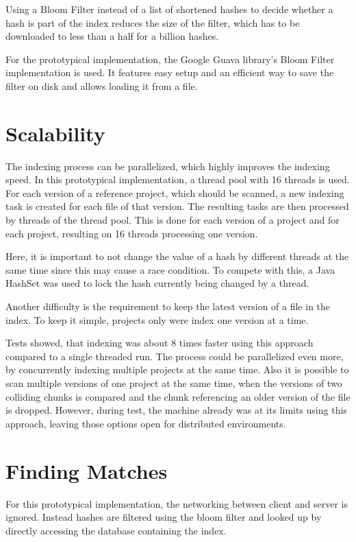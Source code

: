 Using a Bloom Filter instead of a list of shortened hashes to decide whether a hash is part of the index reduces the size of the filter, which has to be downloaded to less than a half for a billion hashes.

For the prototypical implementation, the Google Guava library's Bloom Filter implementation is used.
It features easy setup and an efficient way to save the filter on disk and allows loading it from a file.

\section{Scalability}\label{section:implementation/scalability}
The indexing process can be parallelized, which highly improves the indexing speed.
In this prototypical implementation, a thread pool with 16 threads is used.
For each version of a reference project, which should be scanned, a new indexing task is created for each file of that version.
The resulting tasks are then processed by threads of the thread pool.
This is done for each version of a project and for each project, resulting on 16 threads processing one version.

Here, it is important to not change the value of a hash by different threads at the same time since this may cause a race condition.
To compete with this, a Java HashSet was used to lock the hash currently being changed by a thread.

Another difficulty is the requirement to keep the latest version of a file in the index.
To keep it simple, projects only were index one version at a time.

Tests showed, that indexing was about 8 times faster using this approach compared to a single threaded run.
The process could be parallelized even more, by concurrently indexing multiple projects at the same time.
Also it is possible to scan multiple versions of one project at the same time, when the versions of two colliding chunks is compared and the chunk referencing an older version of the file is dropped.
However, during test, the machine already was at its limits using this approach, leaving those options open for distributed environments.

\section{Finding Matches}\label{section:implementation/finding_matches}
For this prototypical implementation, the networking between client and server is ignored.
Instead hashes are filtered using the bloom filter and looked up by directly accessing the database containing the index.

